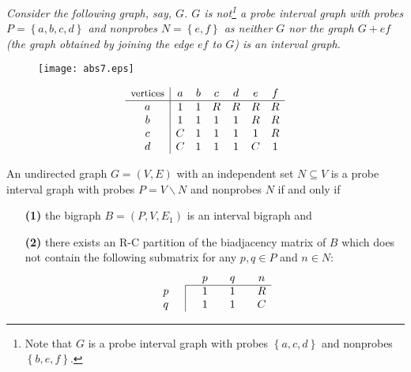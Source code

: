 \documentclass[secthm]{elsart}
\newcommand{\set}[1]{\left\{#1\right\}}
\begin{document}
\begin{exmp}\label{exmp:at}
{\em Consider the following graph, say, $G$. $G$ is not\footnote{Note that $G$ is a probe interval graph with probes $\set{a,c,d}$ and nonprobes $\set{b,e,f}$.} a probe interval graph with probes $P=\set{a,b,c,d}$ and nonprobes $N=\set{e,f}$ as neither $G$ nor the graph $G+ef$ (the graph obtained by joining the edge $ef$ to $G$) is an interval graph.} 

\vspace{1em}
\begin{figure}[h]
\begin{center}
\texttt{[image: abs7.eps]}
\end{center}
\end{figure}

\vspace{1em}{\em But the biadjacency matrix of the bipartite graph $B=(P,V,E_1)$ has an R-C partition showing that $B$ is an interval bigraph.}
$$\begin{array}{c|cccccc}
\textrm{{\small vertices}} & a & b &  c & d & e & f \\
\hline
a & 1 & 1 & R & R & R & R \\
b & 1 & 1 & 1 & 1 & R & R \\
c & C & 1 & 1 & 1 & 1 & R \\
d & C & 1 & 1 & 1 & C & 1 
\end{array}$$
\end{exmp}

\begin{thm}\label{t:char1}
An undirected graph $G=(V,E)$ with an independent set $N\subseteq V$ is a probe interval graph with probes $P=V\smallsetminus N$ and nonprobes $N$ if and only if 
\begin{enumerate}
\item[{\bf (1)}] the bigraph $B=(P,V,E_1)$ is an interval bigraph and
\item[{\bf (2)}] there exists an R-C partition of the biadjacency matrix of $B$ which does not contain the following submatrix for any $p,q\in P$ and $n\in N$:\\[-1em]
\begin{equation}\label{eq:cfg}
\begin{array}{cc|cccccc}
\multicolumn{3}{c}{} & p && q && n\\ \cline{3-8}
p &&& 1 && 1 && R\\
q &&& 1 && 1 && C
\end{array}
\end{equation}
\end{enumerate}
\end{thm}
\end{document}
